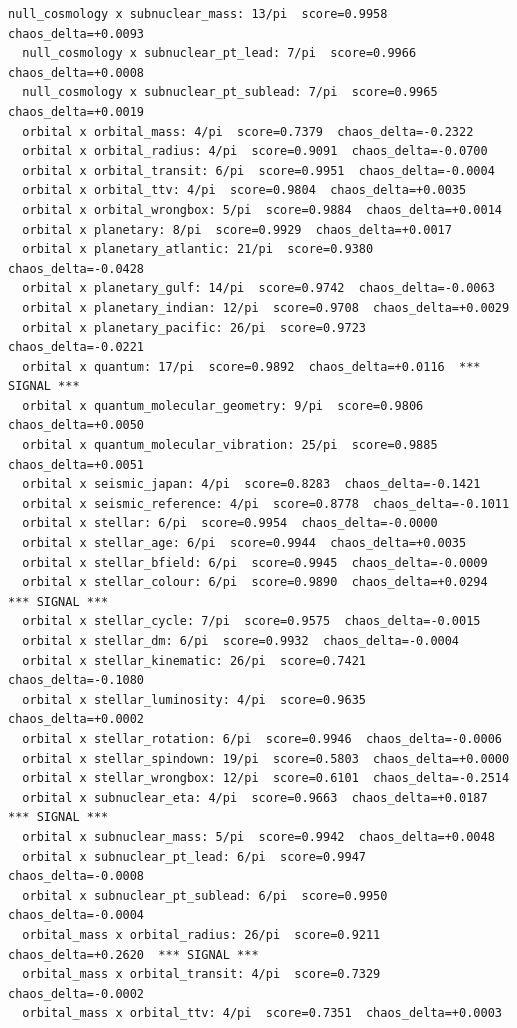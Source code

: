 \documentclass[11pt, letterpaper, openany]{book}
\begin{document}
\begin{empiricalbox}
\begin{lstlisting}[style=terminal]
  null_cosmology x subnuclear_mass: 13/pi  score=0.9958  chaos_delta=+0.0093
  null_cosmology x subnuclear_pt_lead: 7/pi  score=0.9966  chaos_delta=+0.0008
  null_cosmology x subnuclear_pt_sublead: 7/pi  score=0.9965  chaos_delta=+0.0019
  orbital x orbital_mass: 4/pi  score=0.7379  chaos_delta=-0.2322
  orbital x orbital_radius: 4/pi  score=0.9091  chaos_delta=-0.0700
  orbital x orbital_transit: 6/pi  score=0.9951  chaos_delta=-0.0004
  orbital x orbital_ttv: 4/pi  score=0.9804  chaos_delta=+0.0035
  orbital x orbital_wrongbox: 5/pi  score=0.9884  chaos_delta=+0.0014
  orbital x planetary: 8/pi  score=0.9929  chaos_delta=+0.0017
  orbital x planetary_atlantic: 21/pi  score=0.9380  chaos_delta=-0.0428
  orbital x planetary_gulf: 14/pi  score=0.9742  chaos_delta=-0.0063
  orbital x planetary_indian: 12/pi  score=0.9708  chaos_delta=+0.0029
  orbital x planetary_pacific: 26/pi  score=0.9723  chaos_delta=-0.0221
  orbital x quantum: 17/pi  score=0.9892  chaos_delta=+0.0116  *** SIGNAL ***
  orbital x quantum_molecular_geometry: 9/pi  score=0.9806  chaos_delta=+0.0050
  orbital x quantum_molecular_vibration: 25/pi  score=0.9885  chaos_delta=+0.0051
  orbital x seismic_japan: 4/pi  score=0.8283  chaos_delta=-0.1421
  orbital x seismic_reference: 4/pi  score=0.8778  chaos_delta=-0.1011
  orbital x stellar: 6/pi  score=0.9954  chaos_delta=-0.0000
  orbital x stellar_age: 6/pi  score=0.9944  chaos_delta=+0.0035
  orbital x stellar_bfield: 6/pi  score=0.9945  chaos_delta=-0.0009
  orbital x stellar_colour: 6/pi  score=0.9890  chaos_delta=+0.0294  *** SIGNAL ***
  orbital x stellar_cycle: 7/pi  score=0.9575  chaos_delta=-0.0015
  orbital x stellar_dm: 6/pi  score=0.9932  chaos_delta=-0.0004
  orbital x stellar_kinematic: 26/pi  score=0.7421  chaos_delta=-0.1080
  orbital x stellar_luminosity: 4/pi  score=0.9635  chaos_delta=+0.0002
  orbital x stellar_rotation: 6/pi  score=0.9946  chaos_delta=-0.0006
  orbital x stellar_spindown: 19/pi  score=0.5803  chaos_delta=+0.0000
  orbital x stellar_wrongbox: 12/pi  score=0.6101  chaos_delta=-0.2514
  orbital x subnuclear_eta: 4/pi  score=0.9663  chaos_delta=+0.0187  *** SIGNAL ***
  orbital x subnuclear_mass: 5/pi  score=0.9942  chaos_delta=+0.0048
  orbital x subnuclear_pt_lead: 6/pi  score=0.9947  chaos_delta=-0.0008
  orbital x subnuclear_pt_sublead: 6/pi  score=0.9950  chaos_delta=-0.0004
  orbital_mass x orbital_radius: 26/pi  score=0.9211  chaos_delta=+0.2620  *** SIGNAL ***
  orbital_mass x orbital_transit: 4/pi  score=0.7329  chaos_delta=-0.0002
  orbital_mass x orbital_ttv: 4/pi  score=0.7351  chaos_delta=+0.0003

\end{lstlisting}
\end{empiricalbox}
\end{document}

